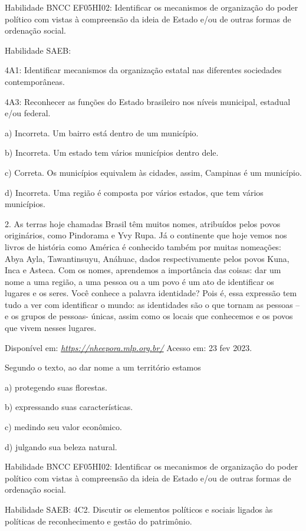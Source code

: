 Habilidade BNCC EF05HI02: Identificar os mecanismos de organização do
poder político com vistas à compreensão da ideia de Estado e/ou de
outras formas de ordenação social.

Habilidade SAEB:

4A1: Identificar mecanismos da organização estatal nas diferentes
sociedades contemporâneas.

4A3: Reconhecer as funções do Estado brasileiro nos níveis municipal,
estadual e/ou federal.

a) Incorreta. Um bairro está dentro de um município.

b) Incorreta. Um estado tem vários municípios dentro dele.

c) Correta. Os municípios equivalem às cidades, assim, Campinas é um
município.

d) Incorreta. Uma região é composta por vários estados, que tem vários
municípios.

2. As terras hoje chamadas Brasil têm muitos nomes, atribuídos pelos
povos originários, como Pindorama e Yvy Rupa. Já o continente que hoje
vemos nos livros de história como América é conhecido também por muitas
nomeações: Abya Ayla, Tawantinsuyu, Anáhuac, dados respectivamente pelos
povos Kuna, Inca e Asteca. Com os nomes, aprendemos a importância das
coisas: dar um nome a uma região, a uma pessoa ou a um povo é um ato de
identificar os lugares e os seres. Você conhece a palavra identidade?
Pois é, essa expressão tem tudo a ver com identificar o mundo: as
identidades são o que tornam as pessoas -- e os grupos de pessoas-
únicas, assim como os locais que conhecemos e os povos que vivem nesses
lugares.

Disponível em:
\href{https://nheepora.mlp.org.br/}{\emph{https://nheepora.mlp.org.br/}}
Acesso em: 23 fev 2023.

Segundo o texto, ao dar nome a um território estamos

a) protegendo suas florestas.

b) expressando suas características.

c) medindo seu valor econômico.

d) julgando sua beleza natural.

Habilidade BNCC EF05HI02: Identificar os mecanismos de organização do
poder político com vistas à compreensão da ideia de Estado e/ou de
outras formas de ordenação social.

Habilidade SAEB: 4C2. Discutir os elementos políticos e sociais ligados
às políticas de reconhecimento e gestão do patrimônio.

